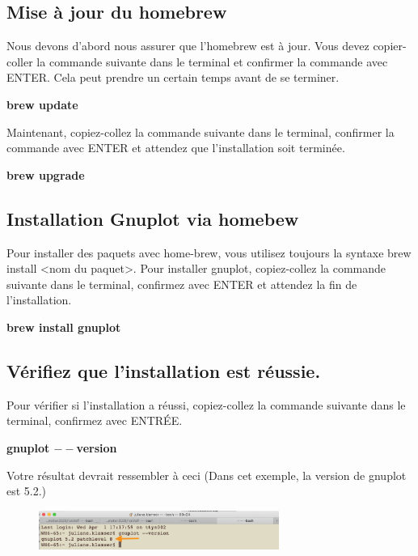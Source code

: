 \documentclass{article}
\begin{document}
\subsection{Mise à jour du homebrew}
Nous devons d'abord nous assurer que l'homebrew est à jour.
Vous devez copier-coller la commande suivante dans le terminal et confirmer la commande avec ENTER. Cela peut prendre un certain temps avant de se terminer.
\begin{tcolorbox}[width=\textwidth,colframe=Bittersweet,colback={black},title={Ceci est le terminal},outer arc=0mm,colupper=white]    
      \large\textbf{brew update}
\end{tcolorbox}
Maintenant, copiez-collez la commande suivante dans le terminal, confirmer la commande avec ENTER et attendez que l'installation soit terminée.
\begin{tcolorbox}[width=\textwidth,colframe=Bittersweet,colback={black},title={Ceci est le terminal},outer arc=0mm,colupper=white]    
      \large\textbf{brew upgrade}
\end{tcolorbox}
\subsection{Installation Gnuplot via homebew}
Pour installer des paquets avec home-brew, vous utilisez toujours la syntaxe brew install <nom du paquet>. Pour installer gnuplot, copiez-collez la commande suivante dans le terminal, confirmez avec ENTER et attendez la fin de l'installation.
\begin{tcolorbox}[width=\textwidth,colframe=Bittersweet,colback={black},title={Ceci est le terminal},outer arc=0mm,colupper=white]    
      \large\textbf{brew install gnuplot}
\end{tcolorbox}
\subsection{Vérifiez que l'installation est réussie.}
Pour vérifier si l'installation a réussi, copiez-collez la commande suivante dans le terminal, confirmez avec ENTRÉE.
\begin{tcolorbox}[width=\textwidth,colframe=Bittersweet,colback={black},title={Ceci est le terminal},outer arc=0mm,colupper=white]    
      \large\textbf{gnuplot $--$version}
\end{tcolorbox}
Votre résultat devrait ressembler à ceci (Dans cet exemple, la version de gnuplot est 5.2.)
\begin{figure}[H]
\center
\includegraphics[width=0.7\textwidth]{Plots/GnuplotCheck.png}
\end{figure}
\end{document}
